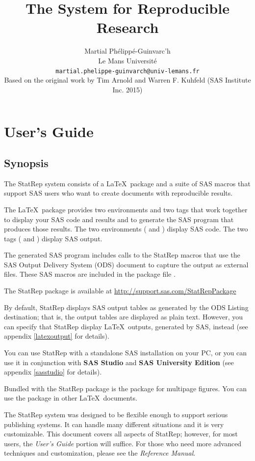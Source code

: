 \documentclass[article,oneside]{memoir}
\title{The \StatRep System for Reproducible Research}
\author{Martial Phélippé-Guinvarc'h\\Le Mans Université \\\texttt{martial.phelippe-guinvarch@univ-lemans.fr}\\
\smallskip
	{\small Based on the original work by Tim Arnold and Warren F. Kuhfeld (SAS Institute Inc. 2015)}}
\newcommand*{\StatRep}{\textsf{StatRep}\xspace}
\begin{document}
\maketitle
\tableofcontents*%
\part{User's Guide}
\chapter{Synopsis}
The \StatRep system consists of a \LaTeX\ package and a suite of SAS macros that
support SAS users who want to create documents with reproducible results.

The \LaTeX\ package provides two environments and
two tags that work together to display your SAS code and results and to
generate the SAS program that produces those results. The two environments
( and ) display SAS code.
The two tags ( and ) display SAS output.

The generated SAS program includes calls to the \StatRep macros that use the SAS
Output Delivery System (ODS) document to capture the output as external files.
These SAS macros are included in the package file .

The \StatRep package is available at \url{http://support.sas.com/StatRepPackage}

By default, \StatRep displays SAS output tables as generated by the ODS Listing
destination; that is, the output tables are displayed as plain text. However, you can
specify that \StatRep display \LaTeX\ outputs, generated by SAS, instead
(see appendix \ref{latexoutput} for details).

You can use \StatRep with a standalone SAS installation on your PC, or you can use it
in conjunction with \textbf{SAS Studio} and \textbf{SAS University Edition}
(see appendix \ref{sasstudio} for details).

Bundled with the \StatRep package is the  package for
multipage figures.
You can use the  package in other \LaTeX\ documents.

The \StatRep system was designed to be flexible enough to support serious publishing systems.
It can handle many different situations and it is very customizable.
This document
covers all aspects of \StatRep; however, for most users, the \textit{User's Guide} portion
will suffice. For those who need more advanced techniques and customization, please see the
\textit{Reference Manual}.
\end{document}
